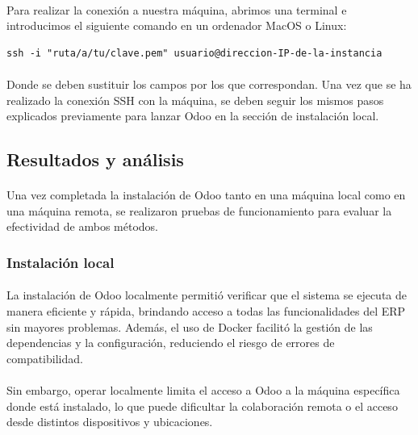 \paragraph{}
Para realizar la conexión a nuestra máquina, abrimos una terminal e introducimos el siguiente comando en un ordenador MacOS o Linux:

\begin{lstlisting}[frame=single, basicstyle=\small]
ssh -i "ruta/a/tu/clave.pem" usuario@direccion-IP-de-la-instancia
\end{lstlisting}

\paragraph{}
Donde se deben sustituir los campos por los que correspondan. Una vez que se ha realizado la conexión SSH con la máquina, se deben seguir los mismos pasos explicados previamente para lanzar Odoo en la sección de instalación local.

\subsection{Resultados y análisis}
\paragraph{}
Una vez completada la instalación de Odoo tanto en una máquina local como en una máquina remota, se realizaron pruebas de funcionamiento para evaluar la efectividad de ambos métodos.

\subsubsection{Instalación local}
\paragraph{}
La instalación de Odoo localmente permitió verificar que el sistema se ejecuta de manera eficiente y rápida, brindando acceso a todas las funcionalidades del ERP sin mayores problemas. Además, el uso de Docker facilitó la gestión de las dependencias y la configuración, reduciendo el riesgo de errores de compatibilidad.
\paragraph{}
Sin embargo, operar localmente limita el acceso a Odoo a la máquina específica donde está instalado, lo que puede dificultar la colaboración remota o el acceso desde distintos dispositivos y ubicaciones.

